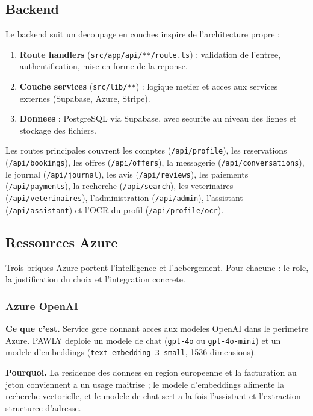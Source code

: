 \documentclass[11pt,a4paper]{article}
\begin{document}
\subsection{Backend}
Le backend suit un decoupage en couches inspire de l'architecture propre :
\begin{enumerate}[leftmargin=1.6em]
  \item \textbf{Route handlers} (\texttt{src/app/api/**/route.ts}) : validation de l'entree, authentification, mise en forme de la reponse.
  \item \textbf{Couche services} (\texttt{src/lib/**}) : logique metier et acces aux services externes (Supabase, Azure, Stripe).
  \item \textbf{Donnees} : PostgreSQL via Supabase, avec securite au niveau des lignes et stockage des fichiers.
\end{enumerate}
Les routes principales couvrent les comptes (\texttt{/api/profile}), les
reservations (\texttt{/api/bookings}), les offres (\texttt{/api/offers}), la
messagerie (\texttt{/api/conversations}), le journal (\texttt{/api/journal}), les
avis (\texttt{/api/reviews}), les paiements (\texttt{/api/payments}), la
recherche (\texttt{/api/search}), les veterinaires (\texttt{/api/veterinaires}),
l'administration (\texttt{/api/admin}), l'assistant (\texttt{/api/assistant}) et
l'OCR du profil (\texttt{/api/profile/ocr}).

\subsection{Ressources Azure}
Trois briques Azure portent l'intelligence et l'hebergement. Pour chacune : le
role, la justification du choix et l'integration concrete.

\subsubsection{Azure OpenAI}
\textbf{Ce que c'est.} Service gere donnant acces aux modeles OpenAI dans le
perimetre Azure. PAWLY deploie un modele de chat (\texttt{gpt-4o} ou
\texttt{gpt-4o-mini}) et un modele d'embeddings (\texttt{text-embedding-3-small},
1536 dimensions).

\textbf{Pourquoi.} La residence des donnees en region europeenne et la
facturation au jeton conviennent a un usage maitrise ; le modele d'embeddings
alimente la recherche vectorielle, et le modele de chat sert a la fois
l'assistant et l'extraction structuree d'adresse.
\end{document}
